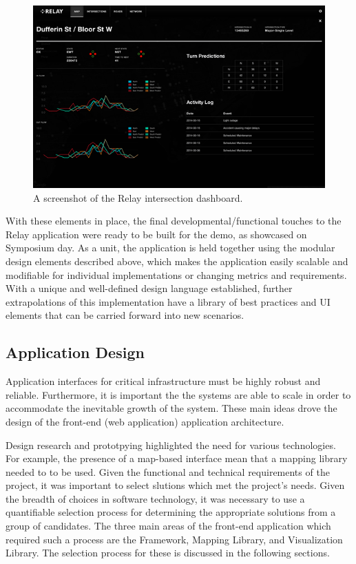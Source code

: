 \documentclass{report}
\begin{document}
\begin{figure}[htbp!]
  \begin{centering}
    \includegraphics[scale=0.73]{figures/dashboard.png}
    \caption{A screenshot of the Relay intersection dashboard.}
    \label{fig:dashboardt}
  \end{centering}
\end{figure}

With these elements in place, the final developmental/functional touches to the Relay application were ready to be built for the demo, as showcased on Symposium day.
As a unit, the application is held together using the modular design elements described above, which makes the application easily scalable and modifiable for individual implementations or changing metrics and requirements.
With a unique and well-defined design language established, further extrapolations of this implementation have a library of best practices and UI elements that can be carried forward into new scenarios.

\subsection{Application Design}

Application interfaces for critical infrastructure must be highly robust and reliable. Furthermore, it is important the the systems are able to scale in order to accommodate the inevitable growth of the system. These main ideas drove the design of the front-end (web application) application architecture. 

Design research and prototpying highlighted the need for various technologies. For example, the presence of a map-based interface mean that a mapping library needed to to be used. Given the functional and technical requirements of the project, it was important to select slutions which met the project's needs. Given the breadth of choices in software technology, it was necessary to use a quantifiable selection process for determining the appropriate solutions from a group of candidates. The three main areas of the front-end application which required such a process are the Framework, Mapping Library, and Visualization Library. The selection process for these is discussed in the following sections.
\end{document}
